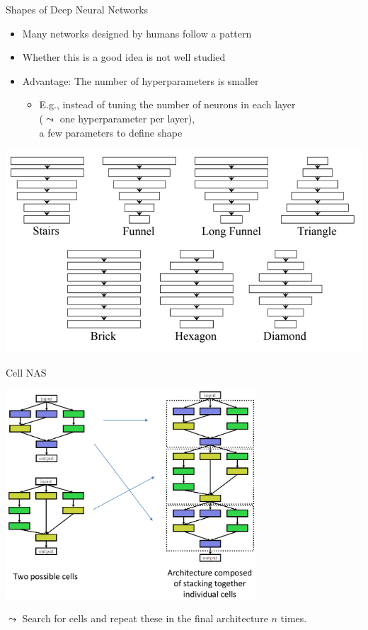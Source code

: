 \begin{frame}[c]{Shapes of Deep Neural Networks }

\begin{itemize}
  \item Many networks designed by humans follow a pattern
  \item Whether this is a good idea is not well studied
  \item Advantage: The number of hyperparameters is smaller
  \begin{itemize}
    \item E.g., instead of tuning the number of neurons in each layer\\ ($\leadsto$ one hyperparameter per layer),\\
          a few parameters to define shape
  \end{itemize} 
\end{itemize}

\medskip
\centering
\includegraphics[width=.6\textwidth]{images/nas_shapes.png}

\end{frame}
\begin{frame}[c]{Cell NAS}

\centering
\includegraphics[width=0.7\textwidth]{images/nas_cellsearch.png}

$\leadsto$ Search for cells and repeat these in the final architecture $n$ times.

\end{frame}
